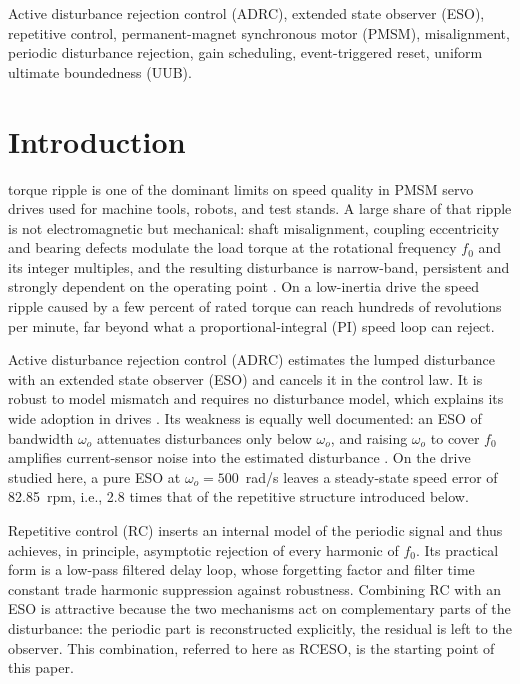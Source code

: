 \documentclass[journal]{IEEEtran}
\theoremstyle{remark}
\begin{document}
\begin{IEEEkeywords}
Active disturbance rejection control (ADRC), extended state observer (ESO),
repetitive control, permanent-magnet synchronous motor (PMSM), misalignment,
periodic disturbance rejection, gain scheduling, event-triggered reset,
uniform ultimate boundedness (UUB).
\end{IEEEkeywords}

\section{Introduction}
 torque ripple is one of the dominant limits on speed
quality in PMSM servo drives used for machine tools, robots, and test stands.
A large share of that ripple is not electromagnetic but mechanical: shaft
misalignment, coupling eccentricity and bearing defects modulate the load torque at
the rotational frequency $f_0$ and its integer multiples, and the resulting
disturbance is narrow-band, persistent and strongly dependent on the operating point
\cite{nandi2005}. On a low-inertia drive the speed ripple caused by a few percent of
rated torque can reach hundreds of revolutions per minute, far beyond what a
proportional-integral (PI) speed loop can reject.

Active disturbance rejection control (ADRC) \cite{han2009,gao2003} estimates the
lumped disturbance with an extended state observer (ESO) and cancels it in the
control law. It is robust to model mismatch and requires no disturbance model, which
explains its wide adoption in drives \cite{han2009}. Its weakness is equally
well documented: an ESO of bandwidth $\omega_o$ attenuates disturbances only below
$\omega_o$, and raising $\omega_o$ to cover $f_0$ amplifies current-sensor noise into
the estimated disturbance \cite{chen2016}. On the drive studied here, a pure ESO at
$\omega_o=500$~rad/s leaves a steady-state speed error of 82.85~rpm, i.e., 2.8 times
that of the repetitive structure introduced below.

Repetitive control (RC) \cite{inoue1981,hara1988,tomizuka1988,longman2000} inserts an
internal model of the periodic signal \cite{francis1976} and thus achieves, in
principle, asymptotic rejection of every harmonic of $f_0$. Its practical form is a
low-pass filtered delay loop, whose forgetting factor and filter time constant trade
harmonic suppression against robustness. Combining RC with an ESO is attractive
because the two mechanisms act on complementary parts of the disturbance: the
periodic part is reconstructed explicitly, the residual is left to the observer.
This combination, referred to here as RCESO, is the starting point of this paper.
\end{document}
